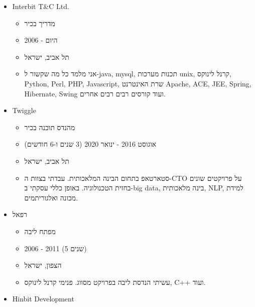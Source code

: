 \documentclass[
  hebrew,
]{article}
\providecommand{\tightlist}{%
  \setlength{\itemsep}{0pt}\setlength{\parskip}{0pt}}
\begin{document}
\begin{itemize}
  \begin{itemize}
  \tightlist
  \item
    מדריך בכיר
  \item
    אוגוסט 2013 - היום
  \item
    תל אביב, ישראל
  \item
    אני מלמד כל מה שקשור ללינוקס, java, mysql, תכנות מערכות unix, קרנל
    לינוקס, Python, Perl, PHP, Javascript, שרת האינטרנט Apache, ACE,
    JEE, Spring, Hibernate, Swing, Ruby ועוד קורסים רבים רבים אחרים.
  \end{itemize}
\item
  Interbit T\&C Ltd.

  \begin{itemize}
  \tightlist
  \item
    מדריך בכיר
  \item
    2006 - היום
  \item
    תל אביב, ישראל
  \item
    אני מלמד כל מה שקשור ל-java, mysql, תכנות מערכות unix, קרנל לינוקס,
    Python, Perl, PHP, Javascript, שרת האינטרנט Apache, ACE, JEE,
    Spring, Hibernate, Swing ועוד קורסים רבים רבים אחרים.
  \end{itemize}
\item
  Twiggle

  \begin{itemize}
  \tightlist
  \item
    מהנדס תוכנה בכיר
  \item
    אוגוסט 2016 - ינואר 2020 (3 שנים ו-6 חודשים)
  \item
    תל אביב, ישראל
  \item
    סטארטאפ בתחום הבינה המלאכותית. עבדתי בצוות ה-CTO על פרויקטים שונים
    בחזית הטכנולוגיה. באופן כללי עסקתי ב-big data, בינה מלאכותית, NLP,
    למידת מכונה ואלגוריתמים.
  \end{itemize}
\item
  רפאל

  \begin{itemize}
  \tightlist
  \item
    מפתח ליבה
  \item
    2006 - 2011 (5 שנים)
  \item
    הצפון, ישראל
  \item
    עשיתי הנדסת ליבה בפרויקט מסווג. פנימי קרנל לינוקס, C++ ועוד.
  \end{itemize}
\item
  Hinbit Development


\end{itemize}
\end{document}
